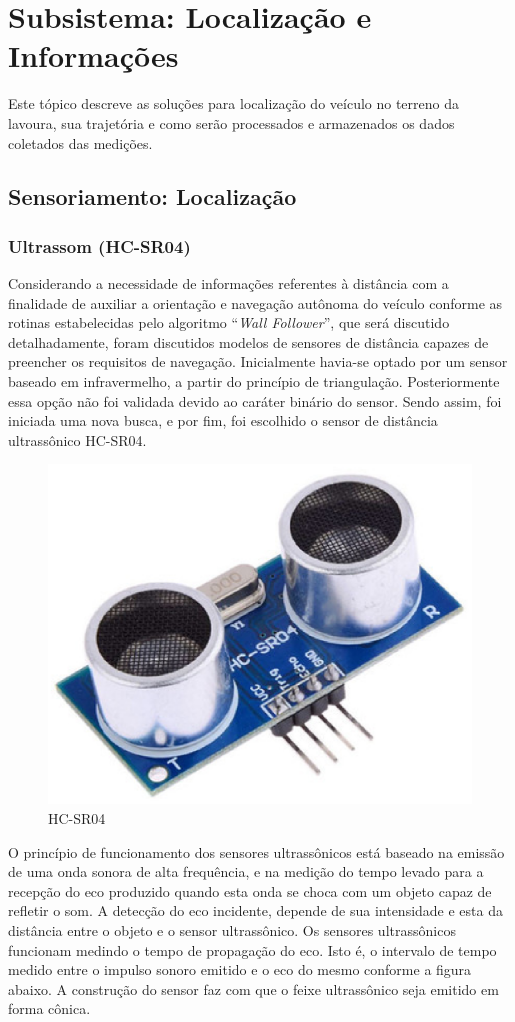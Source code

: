 \section{Subsistema: Localização e Informações}
	Este tópico descreve as soluções para localização do veículo no terreno da lavoura, sua trajetória e
	como serão processados e armazenados os dados coletados das medições.

  \subsection{Sensoriamento: Localização}

  \subsubsection{Ultrassom (HC-SR04)}

Considerando a necessidade de informações referentes à distância com a finalidade de auxiliar a orientação e navegação autônoma do veículo conforme as rotinas estabelecidas pelo algoritmo “\textit{Wall Follower}”, que será discutido detalhadamente, foram discutidos modelos de sensores de distância capazes de preencher os requisitos de navegação.  Inicialmente havia-se optado por um sensor baseado em infravermelho, a partir do princípio de triangulação. Posteriormente essa opção não foi validada devido ao caráter binário do sensor. Sendo assim, foi iniciada uma nova busca, e por fim, foi escolhido o sensor de distância ultrassônico HC-SR04.

		\begin{figure}[!htbp]
			\begin{center}
				\includegraphics[width=.4\textwidth]{figuras/hcsr04.eps}
				\caption{HC-SR04}
			\end{center}
		\end{figure}

O princípio de funcionamento dos sensores ultrassônicos está baseado na emissão de uma onda sonora de alta frequência, e na medição do tempo levado para a recepção do eco produzido quando esta onda se choca com um objeto capaz de refletir o som.
A detecção do eco incidente, depende de sua intensidade e esta da distância entre o objeto e o sensor ultrassônico. Os sensores ultrassônicos funcionam medindo o tempo de propagação do eco. Isto é, o intervalo de tempo medido entre o impulso sonoro emitido e o eco do mesmo conforme a figura abaixo.
A construção do sensor faz com que o feixe ultrassônico seja emitido em forma cônica.

